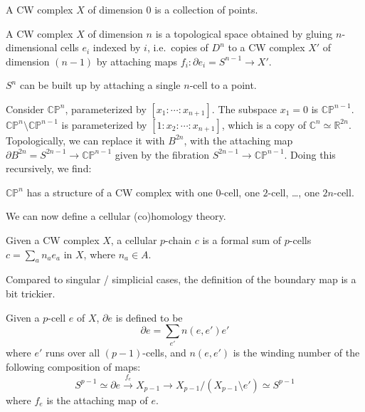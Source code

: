 \documentclass[12pt]{article}
\numberwithin{equation}{section}
\numberwithin{figure}{section}
\theoremstyle{remark}
\def\bC{\mathbb{C}}
\def\bR{\mathbb{R}}
\def\CP{\mathbb{CP}}
\begin{document}
\begin{definition}
  A CW complex $X$ of dimension $0$ is a collection of points.
\end{definition}

\begin{definition}
A CW complex $X$ of dimension $n$ is a topological space obtained by 
gluing $n$-dimensional cells $e_i$ indexed by $i$, 
i.e.~copies of $D^n$
to a CW complex $X'$ of dimension $(n-1)$ by 
attaching maps $f_i:\partial e_i = S^{n-1}\to X'$.
\end{definition}

\begin{example}
$S^n$ can be built up by attaching a single $n$-cell to a point.
\end{example}

Consider $\CP^n$, parameterized by $[x_1:\cdots:x_{n+1}]$.
The subspace $x_1=0$ is $\CP^{n-1}$.
$\CP^n \setminus \CP^{n-1}$ is parameterized by $[1:x_2:\cdots:x_{n+1}]$,
which is a copy of $\bC^n\simeq \bR^{2n}$.
Topologically, we can replace it with $B^{2n}$, 
with the attaching map $\partial B^{2n}=S^{2n-1}\to \CP^{n-1}$ given by 
the fibration $S^{2n-1}\to \CP^{n-1}$.
Doing this recursively, we find:
\begin{example}
$\CP^n$ has a structure of a CW complex with one $0$-cell, 
one $2$-cell, \ldots, one $2n$-cell.
\end{example}

We can now define a cellular (co)homology theory.

\begin{definition}
Given a CW complex $X$,
a cellular $p$-chain $c$ is a formal sum of $p$-cells $c=\sum_a n_a e_a$ in $X$, where $n_a\in A$.
\end{definition}

Compared to singular / simplicial cases, the definition of the boundary map is a bit trickier. 
\begin{definition}
Given a $p$-cell $e$ of $X$, $\partial e$ is defined to be \begin{equation}
\partial e = \sum_{e'} n(e,e') e'
\end{equation} where $e'$ runs over all $(p-1)$-cells, and $n(e,e')$ is 
the winding number of the following composition of maps: \begin{equation}
S^{p-1}\simeq  \partial e \xrightarrow{f_e} X_{p-1} \to X_{p-1}/(X_{p-1}\setminus e') \simeq S^{p-1}
\end{equation}
where $f_e$ is the attaching map of $e$.
\end{definition}
\end{document}
